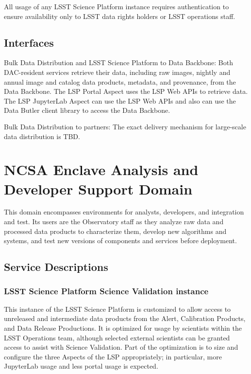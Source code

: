 \documentclass[DM,lsstdraft,toc]{lsstdoc}
\begin{document}
All usage of any LSST Science Platform instance requires authentication
to ensure availability only to LSST data rights holders or LSST
operations staff.

\subsection{Interfaces}\label{dac-interfaces}

Bulk Data Distribution and LSST Science Platform to Data Backbone: Both
DAC-resident services retrieve their data, including raw images, nightly and
annual image and catalog data products, metadata, and provenance, from the Data
Backbone.  The LSP Portal Aspect uses the LSP Web APIs to retrieve data.  The
LSP JupyterLab Aspect can use the LSP Web APIs and also can use the Data Butler
client library to access the Data Backbone.

Bulk Data Distribution to partners: The exact delivery mechanism for
large-scale data distribution is TBD.


\section{NCSA Enclave Analysis and Developer Support
Domain}\label{ncsa-enclave-analysis-and-developer-support-domain}

This domain encompasses environments for analysts, developers, and
integration and test. Its users are the Observatory staff as they
analyze raw data and processed data products to characterize them,
develop new algorithms and systems, and test new versions of components
and services before deployment.

\subsection{Service Descriptions}\label{ncsa-ads-service-descriptions}

\subsubsection{LSST Science Platform Science Validation
instance}\label{lsst-science-platform-science-validation-instance}

This instance of the LSST Science Platform is customized to allow access
to unreleased and intermediate data products from the Alert, Calibration
Products, and Data Release Productions. It is optimized for usage by
scientists within the LSST Operations team, although selected external
scientists can be granted access to assist with Science Validation. Part
of the optimization is to size and configure the three Aspects of the
LSP appropriately; in particular, more JupyterLab usage and less portal
usage is expected.
\end{document}
